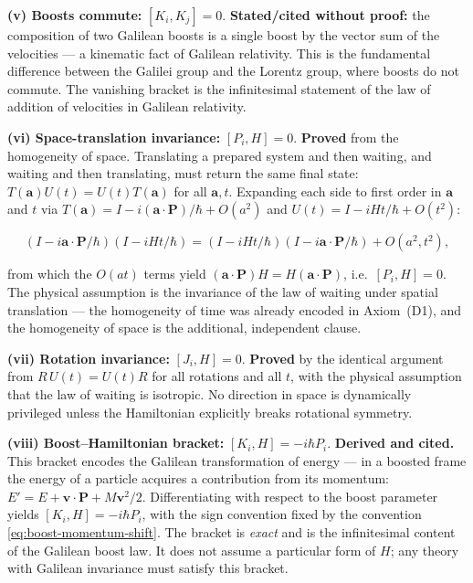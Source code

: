 \medskip\noindent\textbf{(v) Boosts commute:} $[K_i,K_j]=0$. \textbf{Stated/cited without proof:} the composition of two Galilean boosts is a single boost by the vector sum of the velocities --- a kinematic fact of Galilean relativity. This is the fundamental difference between the Galilei group and the Lorentz group, where boosts do not commute. The vanishing bracket is the infinitesimal statement of the law of addition of velocities in Galilean relativity.

\medskip\noindent\textbf{(vi) Space-translation invariance:} $[P_i,H]=0$. \textbf{Proved} from the homogeneity of space. Translating a prepared system and then waiting, and waiting and then translating, must return the same final state: $T(\bm a)U(t) = U(t)T(\bm a)$ for all $\bm a,t$. Expanding each side to first order in $\bm a$ and $t$ via $T(\bm a) = I - i(\bm a\!\cdot\!\bm P)/\hbar + O(a^{2})$ and $U(t) = I - iHt/\hbar + O(t^{2})$:
\begin{linenomath}
\begin{equation*}
(I - i\bm a\!\cdot\!\bm P/\hbar)(I - iHt/\hbar) = (I - iHt/\hbar)(I - i\bm a\!\cdot\!\bm P/\hbar) + O(a^{2},t^{2}),
\end{equation*}
\end{linenomath}
from which the $O(at)$ terms yield $(\bm a\!\cdot\!\bm P)H = H(\bm a\!\cdot\!\bm P)$, i.e.\ $[P_i,H]=0$. The physical assumption is the invariance of the law of waiting under spatial translation --- the homogeneity of time was already encoded in Axiom~(D1), and the homogeneity of space is the additional, independent clause.

\medskip\noindent\textbf{(vii) Rotation invariance:} $[J_i,H]=0$. \textbf{Proved} by the identical argument from $R\,U(t) = U(t)R$ for all rotations and all $t$, with the physical assumption that the law of waiting is isotropic. No direction in space is dynamically privileged unless the Hamiltonian explicitly breaks rotational symmetry.

\medskip\noindent\textbf{(viii) Boost--Hamiltonian bracket:} $[K_i,H] = -i\hbar P_i$. \textbf{Derived and cited.} This bracket encodes the Galilean transformation of energy --- in a boosted frame the energy of a particle acquires a contribution from its momentum: $E' = E + \bm v\!\cdot\!\bm P + M\bm v^{2}/2$. Differentiating with respect to the boost parameter yields $[K_i,H] = -i\hbar P_i$, with the sign convention fixed by the convention \eqref{eq:boost-momentum-shift}. The bracket is \emph{exact} and is the infinitesimal content of the Galilean boost law. It does not assume a particular form of $H$; any theory with Galilean invariance must satisfy this bracket.

